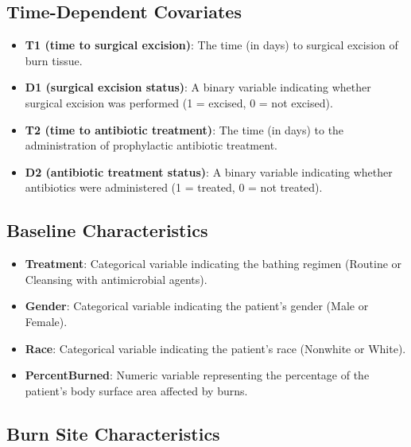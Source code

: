 \documentclass[12pt]{article}
\providecommand{\tightlist}{%
  \setlength{\itemsep}{0pt}\setlength{\parskip}{0pt}}
\begin{document}
\subsection{\texorpdfstring{\textbf{Time-Dependent
Covariates}}{Time-Dependent Covariates}}\label{time-dependent-covariates}

\begin{itemize}
\tightlist
\item
  \textbf{T1 (time to surgical excision)}: The time (in days) to
  surgical excision of burn tissue.
\item
  \textbf{D1 (surgical excision status)}: A binary variable indicating
  whether surgical excision was performed (1 = excised, 0 = not
  excised).
\item
  \textbf{T2 (time to antibiotic treatment)}: The time (in days) to the
  administration of prophylactic antibiotic treatment.
\item
  \textbf{D2 (antibiotic treatment status)}: A binary variable
  indicating whether antibiotics were administered (1 = treated, 0 = not
  treated).
\end{itemize}

\subsection{\texorpdfstring{\textbf{Baseline
Characteristics}}{Baseline Characteristics}}\label{baseline-characteristics}

\begin{itemize}
\tightlist
\item
  \textbf{Treatment}: Categorical variable indicating the bathing
  regimen (Routine or Cleansing with antimicrobial agents).
\item
  \textbf{Gender}: Categorical variable indicating the patient's gender
  (Male or Female).
\item
  \textbf{Race}: Categorical variable indicating the patient's race
  (Nonwhite or White).
\item
  \textbf{PercentBurned}: Numeric variable representing the percentage
  of the patient's body surface area affected by burns.
\end{itemize}

\subsection{\texorpdfstring{\textbf{Burn Site
Characteristics}}{Burn Site Characteristics}}\label{burn-site-characteristics}
\end{document}
